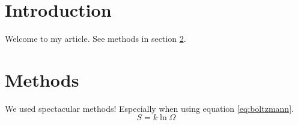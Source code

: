 \documentclass[10pt,letterpaper]{article}
\begin{document}
	\section{Introduction}
	\label{sec:introduction}
	Welcome to my article. See methods in section \ref{sec:methods}.
	\section{Methods}
	\label{sec:methods}
	We used spectacular methods! Especially when using equation \eqref{eq:boltzmann}.
	\begin{equation}
		S = k \ln \Omega
		\label{eq:boltzmann}
	\end{equation}
\end{document}
